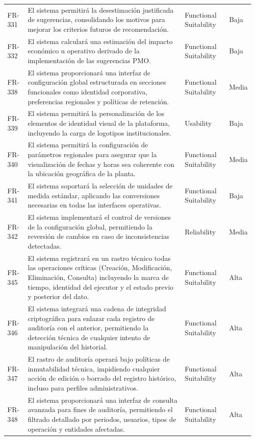 \begin{longtable}{>{\raggedright\arraybackslash}p{} >{\raggedright\arraybackslash}p{} >{\raggedright\arraybackslash}p{} >{\raggedright\arraybackslash}p{}}
FR-331 & El sistema permitirá la desestimación justificada de sugerencias, consolidando los motivos para mejorar los criterios futuros de recomendación. & Functional Suitability & Baja \\
FR-332 & El sistema calculará una estimación del impacto económico u operativo derivado de la implementación de las sugerencias PMO. & Functional Suitability & Baja \\
FR-338 & El sistema proporcionará una interfaz de configuración global estructurada en secciones funcionales como identidad corporativa, preferencias regionales y políticas de retención. & Functional Suitability & Media \\
FR-339 & El sistema permitirá la personalización de los elementos de identidad visual de la plataforma, incluyendo la carga de logotipos institucionales. & Usability & Baja \\
FR-340 & El sistema permitirá la configuración de parámetros regionales para asegurar que la visualización de fechas y horas sea coherente con la ubicación geográfica de la planta. & Functional Suitability & Media \\
FR-341 & El sistema soportará la selección de unidades de medida estándar, aplicando las conversiones necesarias en todas las interfaces operativas. & Functional Suitability & Baja \\
FR-342 & El sistema implementará el control de versiones de la configuración global, permitiendo la reversión de cambios en caso de inconsistencias detectadas. & Reliability & Media \\
FR-345 & El sistema registrará en un rastro técnico todas las operaciones críticas (Creación, Modificación, Eliminación, Consulta) incluyendo la marca de tiempo, identidad del ejecutor y el estado previo y posterior del dato. & Functional Suitability & Alta \\
FR-346 & El sistema integrará una cadena de integridad criptográfica para enlazar cada registro de auditoría con el anterior, permitiendo la detección técnica de cualquier intento de manipulación del historial. & Functional Suitability & Alta \\
FR-347 & El rastro de auditoría operará bajo políticas de inmutabilidad técnica, impidiendo cualquier acción de edición o borrado del registro histórico, incluso para perfiles administrativos. & Functional Suitability & Alta \\
FR-348 & El sistema proporcionará una interfaz de consulta avanzada para fines de auditoría, permitiendo el filtrado detallado por periodos, usuarios, tipos de operación y entidades afectadas. & Functional Suitability & Alta \\

\end{longtable}
